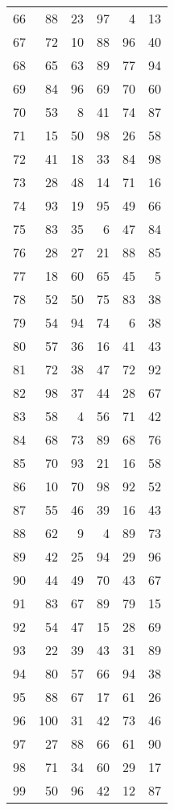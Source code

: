 \begin{tabular}{lrrrrr}
66 &   88 &  23 &  97 &   4 &   13 \\
67 &   72 &  10 &  88 &  96 &   40 \\
68 &   65 &  63 &  89 &  77 &   94 \\
69 &   84 &  96 &  69 &  70 &   60 \\
70 &   53 &   8 &  41 &  74 &   87 \\
71 &   15 &  50 &  98 &  26 &   58 \\
72 &   41 &  18 &  33 &  84 &   98 \\
73 &   28 &  48 &  14 &  71 &   16 \\
74 &   93 &  19 &  95 &  49 &   66 \\
75 &   83 &  35 &   6 &  47 &   84 \\
76 &   28 &  27 &  21 &  88 &   85 \\
77 &   18 &  60 &  65 &  45 &    5 \\
78 &   52 &  50 &  75 &  83 &   38 \\
79 &   54 &  94 &  74 &   6 &   38 \\
80 &   57 &  36 &  16 &  41 &   43 \\
81 &   72 &  38 &  47 &  72 &   92 \\
82 &   98 &  37 &  44 &  28 &   67 \\
83 &   58 &   4 &  56 &  71 &   42 \\
84 &   68 &  73 &  89 &  68 &   76 \\
85 &   70 &  93 &  21 &  16 &   58 \\
86 &   10 &  70 &  98 &  92 &   52 \\
87 &   55 &  46 &  39 &  16 &   43 \\
88 &   62 &   9 &   4 &  89 &   73 \\
89 &   42 &  25 &  94 &  29 &   96 \\
90 &   44 &  49 &  70 &  43 &   67 \\
91 &   83 &  67 &  89 &  79 &   15 \\
92 &   54 &  47 &  15 &  28 &   69 \\
93 &   22 &  39 &  43 &  31 &   89 \\
94 &   80 &  57 &  66 &  94 &   38 \\
95 &   88 &  67 &  17 &  61 &   26 \\
96 &  100 &  31 &  42 &  73 &   46 \\
97 &   27 &  88 &  66 &  61 &   90 \\
98 &   71 &  34 &  60 &  29 &   17 \\
99 &   50 &  96 &  42 &  12 &   87 \\
\bottomrule
\end{tabular}
